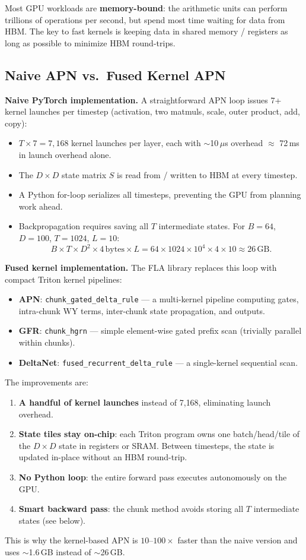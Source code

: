 \documentclass[11pt,a4paper]{article}
\begin{document}
Most GPU workloads are \textbf{memory-bound}: the arithmetic units can perform trillions of operations per second, but spend most time waiting for data from HBM.
The key to fast kernels is keeping data in shared memory / registers as long as possible to minimize HBM round-trips.

\subsection{Naive APN vs.\ Fused Kernel APN}

\textbf{Naive PyTorch implementation.} A straightforward APN loop issues 7+ kernel launches per timestep (activation, two matmuls, scale, outer product, add, copy):
\begin{itemize}
\item $T \times 7 = 7{,}168$ kernel launches per layer, each with $\sim$10\,$\mu$s overhead $\approx$ 72\,ms in launch overhead alone.
\item The $D \times D$ state matrix $S$ is read from / written to HBM at every timestep.
\item A Python for-loop serializes all timesteps, preventing the GPU from planning work ahead.
\item Backpropagation requires saving all $T$ intermediate states. For $B=64$, $D=100$, $T=1024$, $L=10$:
\[
B \times T \times D^2 \times 4\,\text{bytes} \times L = 64 \times 1024 \times 10^4 \times 4 \times 10 \approx 26\,\text{GB}.
\]
\end{itemize}

\textbf{Fused kernel implementation.}
The FLA library replaces this loop with compact Triton kernel pipelines:
\begin{itemize}
\item \textbf{APN}: \texttt{chunk\_gated\_delta\_rule} --- a multi-kernel pipeline computing gates, intra-chunk WY terms, inter-chunk state propagation, and outputs.
\item \textbf{GFR}: \texttt{chunk\_hgrn} --- simple element-wise gated prefix scan (trivially parallel within chunks).
\item \textbf{DeltaNet}: \texttt{fused\_recurrent\_delta\_rule} --- a single-kernel sequential scan.
\end{itemize}

The improvements are:
\begin{enumerate}
\item \textbf{A handful of kernel launches} instead of 7{,}168, eliminating launch overhead.
\item \textbf{State tiles stay on-chip}: each Triton program owns one batch/head/tile of the $D \times D$ state in registers or SRAM. Between timesteps, the state is updated in-place without an HBM round-trip.
\item \textbf{No Python loop}: the entire forward pass executes autonomously on the GPU.
\item \textbf{Smart backward pass}: the chunk method avoids storing all $T$ intermediate states (see below).
\end{enumerate}
This is why the kernel-based APN is $10$--$100\times$ faster than the naive version and uses $\sim$1.6\,GB instead of $\sim$26\,GB.
\end{document}
